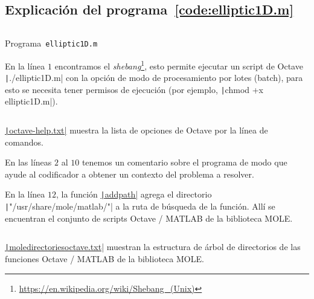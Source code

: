 \begin{problem}
\section*{Explicación del programa~\ref{code:elliptic1D.m}}

\begin{listing}[ht!]
    \tiny
    \centering
    \inputminted[frame=single,framesep=10pt,linenos,firstline=1,lastline=51,highlightlines={21,29}]{octave}{../examples/octave/elliptic1D.m}
    \caption{Programa~\texttt{elliptic1D.m}}
    \label{code:elliptic1D.m}
\end{listing}

En la línea $1$ encontramos el
\emph{shebang}\footnote{\url{https://en.wikipedia.org/wiki/Shebang_(Unix)}},
esto permite ejecutar un script de Octave \texttt|./elliptic1D.m|
con la opción de modo de procesamiento por lotes (batch), para esto
se necesita tener permisos de ejecución (por ejemplo,
\texttt|chmod +x elliptic1D.m|).

\begin{listing}[ht!]
    \tiny
    \centering
    \inputminted{text}{octave-help.txt}
    \caption{\href{https://raw.githubusercontent.com/carlosal1015/mole_examples/refs/heads/main/homework/octave-help.txt}{\texttt|octave-help.txt|}
        muestra la lista de opciones de Octave por la línea de comandos.}
\end{listing}

En las líneas $2$ al $10$ tenemos un comentario sobre el programa de
modo que ayude al codificador a obtener un contexto del problema a
resolver.

En la línea $12$, la función
\href{https://docs.octave.org/v9.3.0/Manipulating-the-Load-Path.html#index-addpath}{\texttt|addpath|}
agrega el directorio \texttt|"/usr/share/mole/matlab/"| a
la ruta de búsqueda de la función.
Allí se encuentran el conjunto de scripts Octave / MATLAB de la
biblioteca MOLE.

\begin{listing}[ht!]
    \tiny
    \centering
    \inputminted{text}{moledirectoriesoctave.txt}
    \caption{\href{https://raw.githubusercontent.com/carlosal1015/mole_examples/refs/heads/main/homework/moledirectoriesoctave.txt}{\texttt|moledirectoriesoctave.txt|}
        muestran la estructura de árbol de directorios de las funciones Octave / MATLAB de la biblioteca MOLE.}
\end{listing}


\end{problem}
